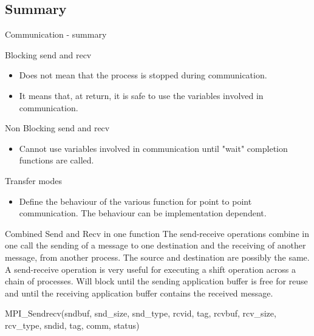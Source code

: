 \documentclass[aspectratio=43]{beamer}
\begin{document}
\subsection{Summary}
\begin{frame}{Communication - summary}
\begin{blue2block}{Blocking send and recv}
\begin{itemize}
\item Does not mean that the process is stopped during communication.
\item It means that, at return, it is safe to use the variables involved in communication.
\end{itemize}
\end{blue2block}

\begin{blue2block}{Non Blocking send and recv}
\begin{itemize}
\item Cannot use variables involved in communication until "wait" completion functions are called.
\end{itemize}
\end{blue2block}

\begin{blue2block}{Transfer modes}
\begin{itemize}
\item Define the behaviour of the various function for point to point communication. The behaviour can be implementation dependent.
\end{itemize}
\end{blue2block}
\end{frame}

\begin{frame}[fragile]{Combined Send and Recv in one function}
\justifying
The send-receive operations combine in one call the sending of a message to one destination and the receiving of another message, from another process.
The source and destination are possibly the same.
A send-receive operation is very useful for executing a shift operation across a chain of processes.
Will block until the sending application buffer is free for reuse and until the receiving application buffer contains the received message.
\begin{Pseudolisting}[]{}
MPI_Sendrecv(sndbuf, snd_size, snd_type, rcvid, tag,
             rcvbuf, rcv_size, rcv_type, sndid, tag,
             comm, status)
\end{Pseudolisting}
\end{frame}
\end{document}
